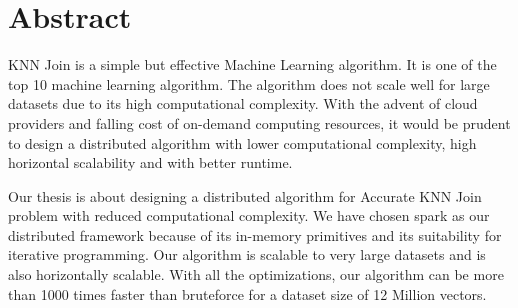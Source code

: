 \chapter*{Abstract}
KNN Join is a simple but effective Machine Learning algorithm. It is
one of the top 10 machine learning algorithm. The algorithm does not
scale well for large datasets due to its high computational
complexity. With the advent of cloud providers and falling cost of
on-demand computing resources, it would be prudent to design a
distributed algorithm with lower computational complexity, high
horizontal scalability and with better runtime.

Our thesis is about designing a distributed algorithm for Accurate
KNN Join problem with reduced computational complexity. We have chosen spark as our
distributed framework because of its in-memory primitives and its
suitability for iterative programming. Our algorithm is scalable to
very large datasets and is also horizontally scalable. With all the
optimizations, our algorithm can be more than 1000 times faster than
bruteforce for a dataset size of 12 Million vectors.
